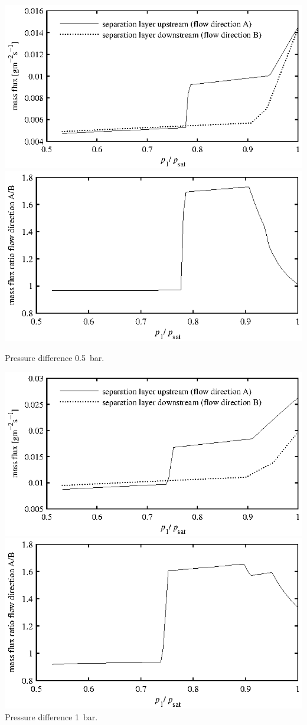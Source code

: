 \documentclass{minimal}
\begin{document}
\raggedright\noindent
\includegraphics{figure1.eps}
\includegraphics{figure2.eps}

Pressure difference 0.5~bar.\bigskip

\noindent\includegraphics{figure3.eps}
\includegraphics{figure4.eps}
Pressure difference 1~bar.\bigskip
\end{document}
